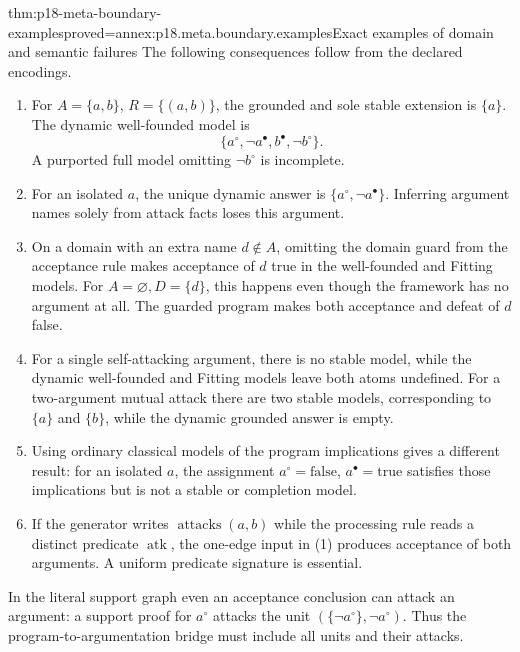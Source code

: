 \begin{hbtheorem}{thm:p18-meta-boundary-examples}{proved=annex:p18.meta.boundary.examples}{Exact examples of domain and semantic failures}
The following consequences follow from the declared encodings.
\begin{enumerate}
\item For \(A=\{a,b\}\), \(R=\{(a,b)\}\), the grounded and sole
      stable extension is \(\{a\}\). The dynamic well-founded
      model is
      \[
              \{a^\circ,\neg a^\bullet,b^\bullet,\neg b^\circ\}.
      \]
      A purported full model omitting \(\neg b^\circ\) is incomplete.
\item For an isolated \(a\), the unique dynamic answer is
      \(\{a^\circ,\neg a^\bullet\}\). Inferring argument names
      solely from attack facts loses this argument.
\item On a domain with an extra name \(d\notin A\), omitting the
      domain guard from the acceptance rule makes acceptance of \(d\)
      true in the well-founded and Fitting models.
      For \(A=\varnothing,D=\{d\}\), this
      happens even though the framework has no argument at all.
      The guarded program makes both acceptance and defeat of
      \(d\) false.
\item For a single self-attacking argument, there is no stable
      model, while the dynamic well-founded and Fitting models
      leave both atoms undefined. For a two-argument mutual attack
      there are two stable models, corresponding to \(\{a\}\)
      and \(\{b\}\), while the dynamic grounded answer is empty.
\item Using ordinary classical models of the program implications
      gives a different result: for an isolated \(a\), the
      assignment \(a^\circ=\mathrm{false}\),
      \(a^\bullet=\mathrm{true}\) satisfies those implications
      but is not a stable or completion model.
\item If the generator writes \(\operatorname{attacks}(a,b)\)
      while the processing rule reads a distinct predicate
      \(\operatorname{atk}\), the one-edge input in (1) produces
      acceptance of both arguments. A uniform predicate signature
      is essential.
\end{enumerate}
In the literal support graph even an acceptance conclusion can
attack an argument: a support proof for \(a^\circ\) attacks
the unit \((\{\neg a^\circ\},\neg a^\circ)\).
Thus the program-to-argumentation bridge must include all units
and their attacks.
\end{hbtheorem}

